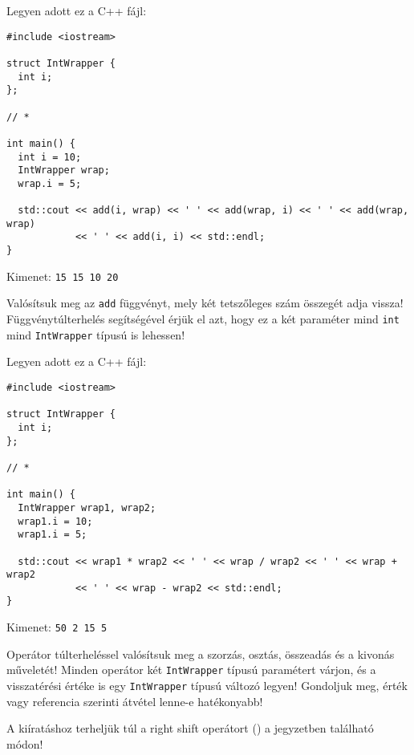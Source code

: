 \documentclass[../exercise_book/exercise_book.tex]{subfiles}
\begin{document}
	\begin{exercise}
		Legyen adott ez a C++ fájl:
		
		\smallskip
		\begin{lstlisting}
#include <iostream>

struct IntWrapper {
  int i;
};

// *

int main() {
  int i = 10;
  IntWrapper wrap;
  wrap.i = 5;

  std::cout << add(i, wrap) << ' ' << add(wrap, i) << ' ' << add(wrap, wrap)
            << ' ' << add(i, i) << std::endl;
}
		\end{lstlisting}
		Kimenet: \texttt{15 15 10 20}
		
		\smallskip
		Valósítsuk meg az \texttt{add} függvényt, mely két tetszőleges szám összegét adja vissza! Függvénytúlterhelés segítségével érjük el azt, hogy ez a két paraméter mind \texttt{int} mind \texttt{IntWrapper} típusú is lehessen!
	\end{exercise}
	\begin{exercise}
		Legyen adott ez a C++ fájl:
		
		\smallskip
		\fbox{\textbf{03\_02overload\_main.cpp}}
		\begin{lstlisting}
#include <iostream>

struct IntWrapper {
  int i;
};

// *

int main() {
  IntWrapper wrap1, wrap2;
  wrap1.i = 10;
  wrap1.i = 5;

  std::cout << wrap1 * wrap2 << ' ' << wrap / wrap2 << ' ' << wrap + wrap2
            << ' ' << wrap - wrap2 << std::endl;
}
		\end{lstlisting}
		Kimenet: \texttt{50 2 15 5}
		
		\smallskip
		Operátor túlterheléssel valósítsuk meg a szorzás, osztás, összeadás és a kivonás műveletét! Minden operátor két \texttt{IntWrapper} típusú paramétert várjon, és a visszatérési értéke is egy \texttt{IntWrapper} típusú változó legyen! Gondoljuk meg, érték vagy referencia szerinti átvétel lenne-e hatékonyabb!
		
		A kiíratáshoz terheljük túl a right shift operátort (\texttt{\<}) a jegyzetben található módon!
	\end{exercise}
	
\end{document}
